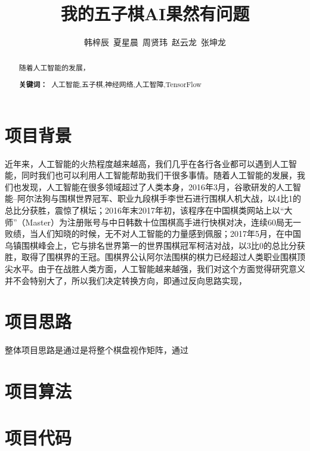 \documentclass[a4paper]{article}
\title{\heiti \Large 我的五子棋AI果然有问题}%
\author{\songti \small 韩梓辰\ 夏星晨\ 周贤玮\ 赵云龙\ 张坤龙}%
\renewcommand{\headrulewidth}{0.4pt}
\begin{document}
\maketitle%
\thispagestyle{fancy}%
\lhead{\textcolor{gray} {计算机科学}}
\rhead{\textcolor{gray} {DOI:xxxxxx}}
\renewcommand{\headrulewidth}{0.4pt}
\begin{abstract}
    随着人工智能的发展，
    \par\textbf{关键词：\ }人工智能,五子棋,神经网络,人工智障,TensorFlow
\end{abstract}
\tableofcontents  %
\newpage
    \begin{multicols}{2}
    \section{项目背景}
    近年来，人工智能的火热程度越来越高，我们几乎在各行各业都可以遇到人工智能，同时我们也可以利用人工智能帮助我们干很多事情。随着人工智能的发展，我们也发现，人工智能在很多领域超过了人类本身，2016年3月，谷歌研发的人工智能--阿尔法狗与围棋世界冠军、职业九段棋手李世石进行围棋人机大战，以4比1的总比分获胜，震惊了棋坛；2016年末2017年初，该程序在中国棋类网站上以“大师”（Master）为注册账号与中日韩数十位围棋高手进行快棋对决，连续60局无一败绩，当人们知晓的时候，无不对人工智能的力量感到佩服；2017年5月，在中国乌镇围棋峰会上，它与排名世界第一的世界围棋冠军柯洁对战，以3比0的总比分获胜，取得了围棋界的王冠。围棋界公认阿尔法围棋的棋力已经超过人类职业围棋顶尖水平。由于在战胜人类方面，人工智能越来越强，我们对这个方面觉得研究意义并不会特别大了，所以我们决定转换方向，即通过反向思路实现，
    \section{项目思路}
    整体项目思路是通过是将整个棋盘视作矩阵，通过
    \section{项目算法}

    \section{项目代码}
    \newpage
    \begin{thebibliography}{30}%
    \end{thebibliography}
    \newpage
\end{multicols}
\end{document}
